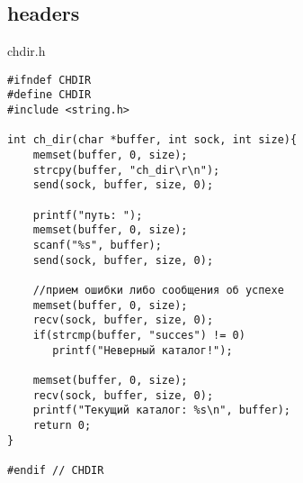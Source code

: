 \documentclass[12pt,a4paper]{report}
\begin{document}
\subsection*{headers}
chdir.h
\begin{lstlisting}
#ifndef CHDIR
#define CHDIR
#include <string.h>

int ch_dir(char *buffer, int sock, int size){
	memset(buffer, 0, size);
    strcpy(buffer, "ch_dir\r\n");
    send(sock, buffer, size, 0);

    printf("путь: ");
    memset(buffer, 0, size);
    scanf("%s", buffer);
    send(sock, buffer, size, 0);

    //прием ошибки либо сообщения об успехе
    memset(buffer, 0, size);
    recv(sock, buffer, size, 0);
    if(strcmp(buffer, "succes") != 0)
       printf("Неверный каталог!");

    memset(buffer, 0, size);
    recv(sock, buffer, size, 0);
    printf("Текущий каталог: %s\n", buffer);
    return 0;
}

#endif // CHDIR
\end{lstlisting}
\end{document}
